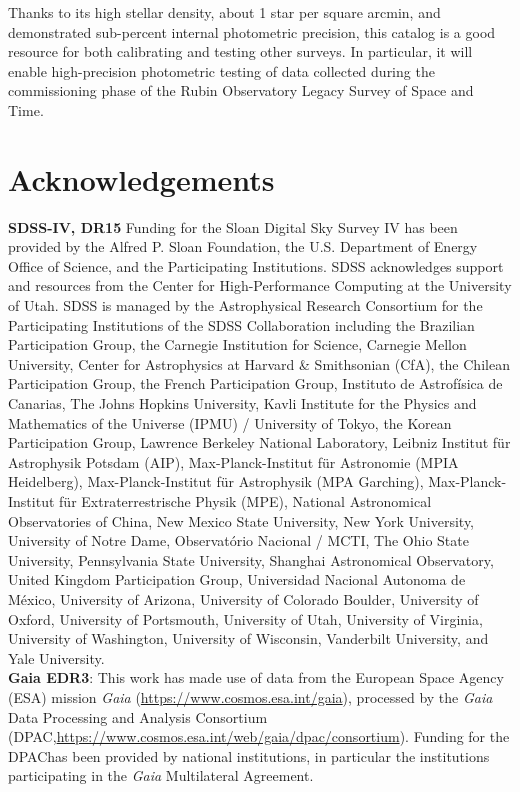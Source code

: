 \documentclass[fleqn,usenatbib]{mnras}
\begin{document}
Thanks to its high stellar density, about 1 star per square arcmin, and demonstrated sub-percent 
internal photometric precision, this catalog is a good resource for both calibrating and testing 
other surveys. In particular, it will enable high-precision photometric testing of data collected 
during the commissioning phase of the Rubin Observatory Legacy Survey of Space and Time. 

\newpage

\section*{Acknowledgements}

{\bf SDSS-IV, DR15} Funding for the Sloan Digital Sky Survey IV has been provided by the Alfred P. Sloan Foundation, the U.S. Department of Energy Office of Science, and the Participating Institutions. SDSS acknowledges support and resources from the Center for High-Performance Computing at the University of Utah. SDSS is managed by the Astrophysical Research Consortium for the Participating Institutions of the SDSS Collaboration including the Brazilian Participation Group, the Carnegie Institution for Science, Carnegie Mellon University, Center for Astrophysics at Harvard \& Smithsonian (CfA), the Chilean Participation Group, the French Participation Group, Instituto de Astrof{\'i}sica de Canarias, The Johns Hopkins University, Kavli Institute for the Physics and Mathematics of the Universe (IPMU) / University of Tokyo, the Korean Participation Group, Lawrence Berkeley National Laboratory, Leibniz Institut f{\"u}r Astrophysik Potsdam (AIP), Max-Planck-Institut f{\"u}r Astronomie (MPIA Heidelberg), Max-Planck-Institut f{\"u}r Astrophysik (MPA Garching), Max-Planck-Institut f{\"u}r Extraterrestrische Physik (MPE), National Astronomical Observatories of China, New Mexico State University, New York University, University of Notre Dame, Observat{\'o}rio Nacional / MCTI, The Ohio State University, Pennsylvania State University, Shanghai Astronomical Observatory, United Kingdom Participation Group, Universidad Nacional Autonoma de M{\'e}xico, University of Arizona, University of Colorado Boulder, University of Oxford, University of Portsmouth, University of Utah, University of Virginia, University of Washington, University of Wisconsin, Vanderbilt University, and Yale University. \\
{\bf Gaia EDR3}: This work has made use of data from the European Space Agency (ESA) mission {\it Gaia} (\url{https://www.cosmos.esa.int/gaia}), processed by the {\it Gaia} Data Processing and Analysis Consortium (DPAC,\url{https://www.cosmos.esa.int/web/gaia/dpac/consortium}). Funding for the DPAChas been provided by national institutions, in particular the institutions participating in the {\it Gaia} Multilateral Agreement.\\
\end{document}
